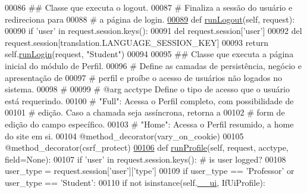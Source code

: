 \begin{DoxyCode}
00086     \textcolor{comment}{## Classe que executa o logout.}
00087     \textcolor{comment}{#   Finaliza a sessão do usuário e redireciona para }
00088     \textcolor{comment}{#   a página de login.}
\hypertarget{MainUnit_8py_source_l00089}{}\hyperlink{classELO_1_1MainUnit_1_1Factory_a3cf09225adad89e9802b3df03f39f86b}{00089}     \textcolor{keyword}{def }\hyperlink{classELO_1_1MainUnit_1_1Factory_a3cf09225adad89e9802b3df03f39f86b}{runLogout}(self, request):
00090         \textcolor{keywordflow}{if} \textcolor{stringliteral}{'user'} \textcolor{keywordflow}{in} request.session.keys():
00091             del request.session[\textcolor{stringliteral}{'user'}]
00092             del request.session[translation.LANGUAGE\_SESSION\_KEY]
00093         \textcolor{keywordflow}{return} self.\hyperlink{classELO_1_1MainUnit_1_1Factory_a2d2e0e20ae0e92c1598c0fcab23a705a}{runLogin}(request, \textcolor{stringliteral}{"Student"})
00094 
00095     \textcolor{comment}{## Classe que executa a página inicial do módulo de Perfil.}
00096     \textcolor{comment}{#   Define as camadas de persistência, negócio e apresentação de}
00097     \textcolor{comment}{#   perfil e proíbe o acesso de usuários não logados no sistema.}
00098     \textcolor{comment}{#}
00099     \textcolor{comment}{#   @arg acctype    Define o tipo de acesso que o usuário está requerindo.}
00100     \textcolor{comment}{#                   "Full": Acessa o Perfil completo, com possibilidade de}
00101     \textcolor{comment}{#                       edição. Caso a chamada seja assíncrona, retorna a}
00102     \textcolor{comment}{#                       form de edição do campo específico.}
00103     \textcolor{comment}{#                   "Home": Acessa o Perfil resumido, a home do site em si.}
00104     @method\_decorator(vary\_on\_cookie)
00105     @method\_decorator(csrf\_protect)
\hypertarget{MainUnit_8py_source_l00106}{}\hyperlink{classELO_1_1MainUnit_1_1Factory_ab20a76f74180fc77c6b8fcd8de7942f1}{00106}     \textcolor{keyword}{def }\hyperlink{classELO_1_1MainUnit_1_1Factory_ab20a76f74180fc77c6b8fcd8de7942f1}{runProfile}(self, request, acctype, field=None):
00107         \textcolor{keywordflow}{if} \textcolor{stringliteral}{'user'} \textcolor{keywordflow}{in} request.session.keys(): \textcolor{comment}{# is user logged?}
00108             user\_type = request.session[\textcolor{stringliteral}{'user'}][\textcolor{stringliteral}{'type'}]
00109             \textcolor{keywordflow}{if} user\_type == \textcolor{stringliteral}{'Professor'} \textcolor{keywordflow}{or} user\_type == \textcolor{stringliteral}{'Student'}:
00110                 \textcolor{keywordflow}{if} \textcolor{keywordflow}{not} isinstance(self.\hyperlink{classELO_1_1MainUnit_1_1Factory_a189a44a11e1a66ba69663eb2c598dd7c}{\_\_ui}, IfUiProfile):

\end{DoxyCode}
